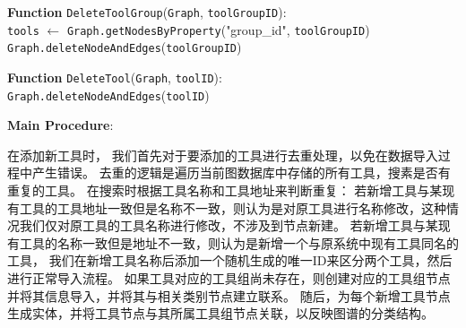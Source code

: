 \begin{algorithm}[!hpt]

    \label{alg:delete_tool_graph}
    

    \BlankLine
    \textbf{Function} \texttt{DeleteToolGroup}(\texttt{Graph}, \texttt{toolGroupID}):\\
    \Indp
        \texttt{tools} $\gets$ \texttt{Graph.getNodesByProperty}("group\_id", \texttt{toolGroupID})\;
        \texttt{Graph.deleteNodeAndEdges}(\texttt{toolGroupID})\;
    \Indm
    \BlankLine
    
    \textbf{Function} \texttt{DeleteTool}(\texttt{Graph}, \texttt{toolID}):\\
    \Indp
        \texttt{Graph.deleteNodeAndEdges}(\texttt{toolID})\;
    \Indm
    \BlankLine
    
    \textbf{Main Procedure}:\\
    \Indp
    \Indm
    \end{algorithm}

在添加新工具时，
我们首先对于要添加的工具进行去重处理，以免在数据导入过程中产生错误。
去重的逻辑是遍历当前图数据库中存储的所有工具，搜素是否有重复的工具。
在搜索时根据工具名称和工具地址来判断重复：
若新增工具与某现有工具的工具地址一致但是名称不一致，则认为是对原工具进行名称修改，这种情况我们仅对原工具的工具名称进行修改，不涉及到节点新建。
若新增工具与某现有工具的名称一致但是地址不一致，则认为是新增一个与原系统中现有工具同名的工具，
我们在新增工具名称后添加一个随机生成的唯一ID来区分两个工具，然后进行正常导入流程。
如果工具对应的工具组尚未存在，则创建对应的工具组节点并将其信息导入，并将其与相关类别节点建立联系。
随后，为每个新增工具节点生成实体，并将工具节点与其所属工具组节点关联，以反映图谱的分类结构。

